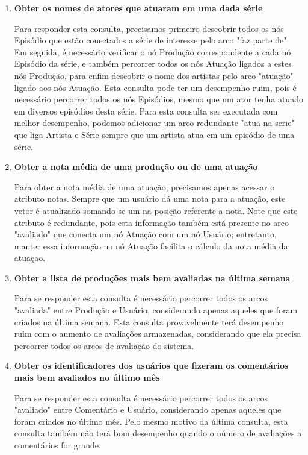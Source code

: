 \documentclass[12pt]{article}
\begin{document}
\begin{enumerate}
    \item{\bf Obter os nomes de atores que atuaram em uma dada série}
        
        Para responder esta consulta, precisamos primeiro descobrir 
        todos os nós Episódio que estão conectados a série de interesse
        pelo arco "faz parte de". Em seguida, é necessário verificar o 
        nó Produção correspondente a cada nó Episódio da série, e 
        também percorrer todos os nós Atuação ligados a estes nós 
        Produção, para enfim descobrir o nome dos artistas pelo arco
        "atuação" ligado aos nós Atuação. Esta consulta pode ter um
        desempenho ruim, pois é necessário percorrer todos os nós 
        Episódios, mesmo que um ator tenha atuado em diversos episódios
        desta série. Para esta consulta ser executada com melhor 
        desempenho, podemos adicionar um arco redundante "atua na serie" 
        que liga Artista e Série sempre que um artista atua em um 
        episódio de uma série.

    \item{\bf Obter a nota média de uma produção ou de uma atuação}

        Para obter a nota média de uma atuação, precisamos apenas 
        acessar o atributo {\ttfamily notas}. Sempre que um usuário
        dá uma nota para a atuação, este vetor é atualizado somando-se
        um na posição referente a nota. Note que este atributo é 
        redundante, pois esta informação também está presente no arco
        "avaliado" que conecta um nó Atuação com um nó Usuário; 
        entretanto, manter essa informação no nó Atuação facilita o 
        cálculo da nota média da atuação.

    \item{\bf Obter a lista de produções mais bem avaliadas na última 
        semana}
        \label{consulta8}
        
        Para se responder esta consulta é necessário percorrer todos os
        arcos "avaliada" entre Produção e Usuário, considerando apenas
        aqueles que foram criados na última semana. Esta consulta 
        provavelmente terá desempenho ruim com o aumento de avaliações
        armazenadas, considerando que ela precisa percorrer todos os 
        arcos de avaliação do sistema.

    \item{\bf Obter os identificadores dos usuários que fizeram os 
        comentários mais bem avaliados no último mês}
        \label{consulta9}

        Para se responder esta consulta é necessário percorrer todos os
        arcos "avaliado" entre Comentário e Usuário, considerando apenas
        aqueles que foram criados no último mês. Pelo mesmo motivo da 
        última consulta, esta consulta também não terá bom desempenho
        quando o número de avaliações a comentários for grande.
\end{enumerate}
\end{document}
